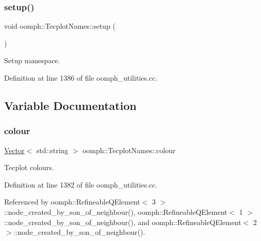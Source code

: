 \subsubsection{\texorpdfstring{setup()}{setup()}}
{\footnotesize\ttfamily void oomph\+::\+Tecplot\+Names\+::setup (\begin{DoxyParamCaption}{ }\end{DoxyParamCaption})}



Setup namespace. 



Definition at line 1386 of file oomph\+\_\+utilities.\+cc.



\subsection{Variable Documentation}
\mbox{\label{namespaceoomph_1_1TecplotNames_a628a7d88afc7542861c9afd2f4ea498c}} 
\subsubsection{\texorpdfstring{colour}{colour}}
{\footnotesize\ttfamily \hyperlink{classoomph_1_1Vector}{Vector}$<$ std\+::string $>$ oomph\+::\+Tecplot\+Names\+::colour}



Tecplot colours. 



Definition at line 1382 of file oomph\+\_\+utilities.\+cc.



Referenced by oomph\+::\+Refineable\+Q\+Element$<$ 3 $>$\+::node\+\_\+created\+\_\+by\+\_\+son\+\_\+of\+\_\+neighbour(), oomph\+::\+Refineable\+Q\+Element$<$ 1 $>$\+::node\+\_\+created\+\_\+by\+\_\+son\+\_\+of\+\_\+neighbour(), and oomph\+::\+Refineable\+Q\+Element$<$ 2 $>$\+::node\+\_\+created\+\_\+by\+\_\+son\+\_\+of\+\_\+neighbour().

